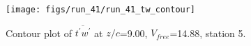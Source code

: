 \begin{figure}[H]
\centering
\texttt{[image: figs/run\_41/run\_41\_tw\_contour]}
\caption{Contour plot of $\overline{t^\prime w^\prime}$ at $z/c$=9.00, $V_{free}$=14.88, station 5.}
\label{fig:run_41_tw_contour}
\end{figure}


